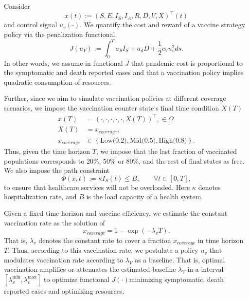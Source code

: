 \documentclass[a4paper,10pt]{amsart}
\begin{document}
Consider
  {$${x(t):= (S,E,I_S,I_A,R,D,V,X)^{\top}(t)}$$} and control signal
  $u_v(\cdot)$. We quantify the cost and reward of a vaccine strategy 
  policy via the penalization functional
  \begin{equation}
    \label{eqn:cost_functional}
    J(u_V):=
      \int _0 ^ T
      a_S I_S + a_d D +
      \frac{1}{2}
        c_V u_v^2
      ds.
  \end{equation}
  In other words, we assume in functional $J$ that pandemic cost is proportional to the
  symptomatic and death reported cases and that a vaccination policy
  implies quadratic consumption of resources.

  Further, since we aim to simulate vaccination policies at different coverage
  scenarios, we impose the vaccination counter state's final
  time condition $X(T)$
  \begin{equation}
    \begin{aligned}
      x(T) &= (\cdot, \cdot, \cdot, \cdot, \cdot, X(T))^{\top},
      \in \Omega
      \\
      X(T)
        &= x_{cover age},
      \\
      x_{coverage}
        & \in
        \left \{
          \text{Low(0.2)},\text{Mid(0.5)}, \text{High(0.8)}
        \right \} .
    \end{aligned}
  \end{equation}
  Thus, given the time horizon $T$, we impose that the last fraction of
  vaccinated populations corresponds to 20\%, 50\% or 80\%, and
  the rest of final states as free. We also impose the path constraint
  \begin{equation}
    \label{eqn:path_constrain}
    \Phi(x,t):= \kappa I_S(t) \leq B,
    \qquad \forall t \in [0, T],
  \end{equation}
  to ensure that healthcare services will not be overloaded. Here $\kappa$
  denotes hospitalization rate, and $B$ is the load capacity of a
  health system.

Given a fixed time horizon and vaccine efficiency, 
we estimate the constant vaccination rate as the solution of
\begin{equation}
    x_{coverage} = 1 - \exp(-\lambda_v T).
\end{equation}
 That is, $\lambda_v$ denotes the constant rate
to cover  a fraction $x_{coverage}$ in time horizon $T$. 
Thus, according to this vaccination rate, we postulate a policy $u_v$ that 
modulates vaccination rate according to $\lambda_V$ as a baseline. That is,
optimal vaccination amplifies or attenuates the estimated baseline 
$\lambda_V$ in a interval $[\lambda_v^{\min}, \lambda_v^{\max}]$ 
to optimize functional $J(\cdot)$\textemdash minimizing 
symptomatic, death reported cases and optimizing resources.
\end{document}
